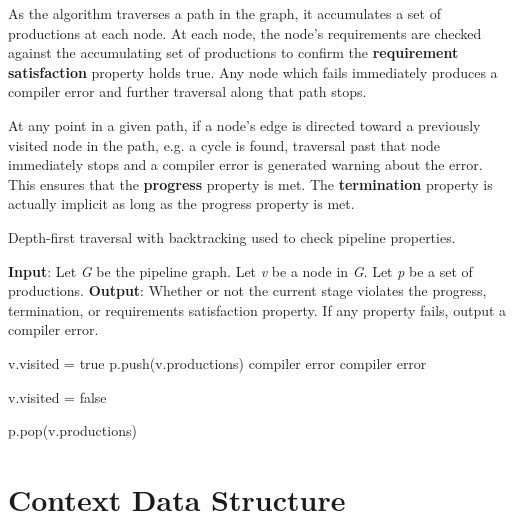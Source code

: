 As the algorithm traverses a path in the graph, it accumulates a set of productions at each node. At each node, the node's requirements are checked against the accumulating set of productions to confirm the \textbf{requirement satisfaction} property holds true. Any node which fails immediately produces a compiler error and further traversal along that path stops.

At any point in a given path, if a node's edge is directed toward a previously visited node in the path, e.g. a cycle is found, traversal past that node immediately stops and a compiler error is generated warning about the error. This ensures that the \textbf{progress} property is met. The \textbf{termination} property is actually implicit as long as the progress property is met. 

\begin{algorithm}
 \caption{Depth-first traversal with backtracking used to check pipeline properties.}
 \label{alg:dfs}
 \begin{algorithmic}
 \State
 \State \textbf{Input}: Let \textit{G} be the pipeline graph. Let \textit{v} be a node in \textit{G}. Let \textit{p} be a set of productions.
 \State \textbf{Output}: Whether or not the current stage violates the progress, termination, or requirements satisfaction property. If any property fails, output a compiler error.
 \State 
 
 	\State v.visited = true
 	\State p.push(v.productions)
 				\State {}
 			\Else
 				\State \Return compiler error
 			\EndIf
 		\EndFor
	\Else 	
 		\State \Return compiler error
 	\EndIf
 	
 	\State v.visited = false 
 	
 	\State p.pop(v.productions) 
 \EndFunction
 \end{algorithmic}
 
\end{algorithm}

\section{Context Data Structure} \label{context_guide}

